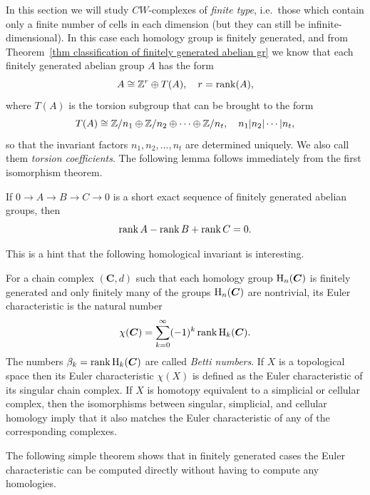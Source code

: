 In this section we will study $CW$-complexes of \emph{finite type}, i.e.~those which contain only a finite number of cells in each dimension (but they can still be infinite-dimensional). In this case each homology group is finitely generated, and from Theorem~\ref{thm classification of finitely generated abelian gr} we know that each finitely generated abelian group $A$ has the form
\[A\cong \mathbb{Z}^r\oplus T(A),\quad r=\operatorname{rank}(A),\]
where $T(A)$ is the torsion subgroup that can be brought to the form
\[T(A)\cong \mathbb{Z}/n_1\oplus \mathbb{Z}/n_2\oplus \cdots \oplus \mathbb{Z}/n_t,\quad n_1|n_2|\cdots |n_t,\]
so that the invariant factors $n_1,n_2,\ldots,n_t$ are determined uniquely. We also call them \emph{torsion coefficients}. The following lemma follows immediately from the first isomorphism theorem.

\begin{lem}
    If $0\to A\to B\to C\to 0$ is a short exact sequence of finitely generated abelian groups, then
    \[\operatorname{rank} A-\operatorname{rank} B+\operatorname{rank} C=0.\]
\end{lem}

This is a hint that the following homological invariant is interesting.

\begin{defn}
    For a chain complex $(\bm{C},d)$ such that each homology group $\mathrm{H}_n(\boldsymbol{C})$ is finitely generated and only finitely many of the groups $\mathrm{H}_n(\boldsymbol{C})$ are nontrivial, its Euler characteristic is the natural number
    \[\chi(\boldsymbol{C})=\sum_{k=0}^\infty (-1)^k \operatorname{rank} \mathrm{H}_k(\boldsymbol{C}).\]
    The numbers $\beta_k=\operatorname{rank} \mathrm{H}_k(\boldsymbol{C})$ are called \emph{Betti numbers}.
    If $X$ is a topological space then its Euler characteristic $\chi(X)$ is defined as the Euler characteristic of its singular chain complex. If $X$ is homotopy equivalent to a simplicial or cellular complex, then the isomorphisms between singular, simplicial, and cellular homology imply that it also matches the Euler characteristic of any of the corresponding complexes.
\end{defn}

The following simple theorem shows that in finitely generated cases the Euler characteristic can be computed directly without having to compute any homologies.

